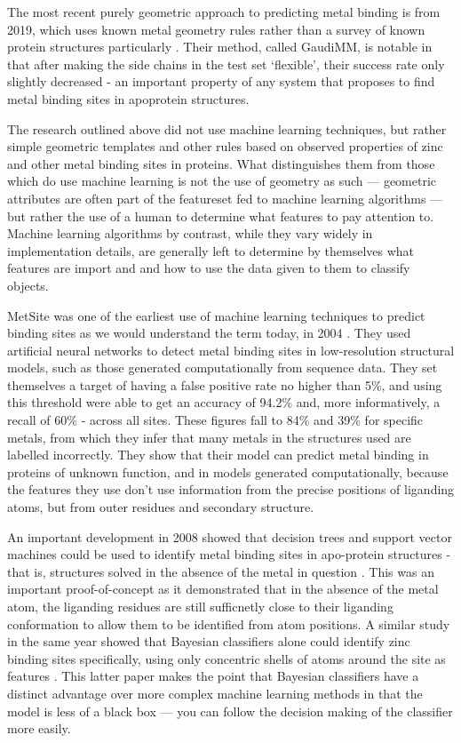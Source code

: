 The most recent purely geometric approach to predicting metal binding is from 2019, which uses known metal geometry rules rather than a survey of known protein structures particularly \cite{sciortino2019}. Their method, called GaudiMM, is notable in that after making the side chains in the test set `flexible', their success rate only slightly decreased - an important property of any system that proposes to find metal binding sites in apoprotein structures.

The research outlined above did not use machine learning techniques, but rather simple geometric templates and other rules based on observed properties of zinc and other metal binding sites in proteins. What distinguishes them from those which do use machine learning is not the use of geometry as such --- geometric attributes are often part of the featureset fed to machine learning algorithms --- but rather the use of a human to determine what features to pay attention to. Machine learning algorithms by contrast, while they vary widely in implementation details, are generally left to determine by themselves what features are import and and how to use the data given to them to classify objects.


MetSite was one of the earliest use of machine learning techniques to predict binding sites as we would understand the term today, in 2004 \cite{sodhi2004predicting}. They used artificial neural networks to detect metal binding sites in low-resolution structural models, such as those generated computationally from sequence data. They set themselves a target of having a false positive rate no higher than 5\%, and using this threshold were able to get an  accuracy of 94.2\% and, more informatively, a recall of 60\% - across all sites. These figures fall to 84\% and 39\% for specific metals, from which they infer that many metals in the structures used are labelled incorrectly. They show that their model can predict metal binding in proteins of unknown function, and in models generated computationally, because the features they use don't use information from the precise positions of liganding atoms, but from outer residues and secondary structure.

An important development in 2008 showed that decision trees and support vector machines could be used to identify metal binding sites in apo-protein structures - that is, structures solved in the absence of the metal in question \cite{babor2008}. This was an important proof-of-concept as it demonstrated that in the absence of the metal atom, the liganding residues are still sufficnetly close to their liganding conformation to allow them to be identified from atom positions. A similar study in the same year showed that Bayesian classifiers alone could identify zinc binding sites specifically, using only concentric shells of atoms around the site as features \cite{ebert2008}. This latter paper makes the point that Bayesian classifiers have a distinct advantage over more complex machine learning methods in that the model is less of a black box --- you can follow the decision making of the classifier more easily.

